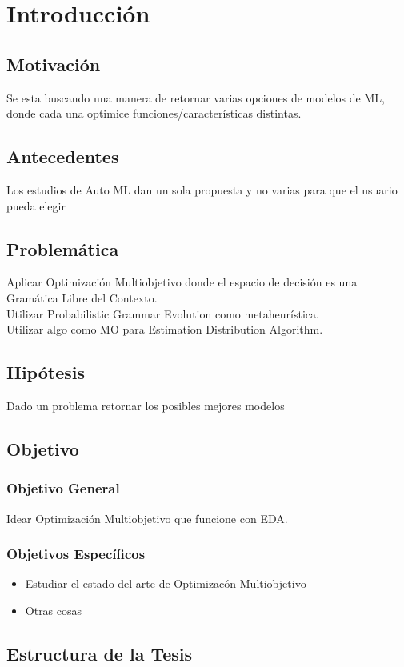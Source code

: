 \chapter*{Introducción}\label{chapter:introduction}

\section*{Motivaci\'on}
Se esta buscando una manera de retornar varias opciones de modelos de ML, donde cada una optimice funciones/caracter\'isticas distintas.

\section*{Antecedentes}
Los estudios de Auto ML dan un sola propuesta y no varias para que el usuario pueda elegir

\section*{Problem\'atica}
Aplicar Optimizaci\'on Multiobjetivo donde el espacio de decisi\'on es una Gram\'atica Libre del Contexto.\\
Utilizar Probabilistic Grammar Evolution como metaheur\'istica.\\
Utilizar algo como MO para Estimation Distribution Algorithm.

\section*{Hip\'otesis}
Dado un problema retornar los posibles mejores modelos

\section*{Objetivo}
\subsection*{Objetivo General}
Idear Optimizaci\'on Multiobjetivo  que funcione con EDA.
\subsection*{Objetivos Espec\'ificos}
\begin{itemize}
    \item Estudiar el estado del arte de Optimizac\'on Multiobjetivo
    \item Otras cosas
\end{itemize}

\section*{Estructura de la Tesis}
